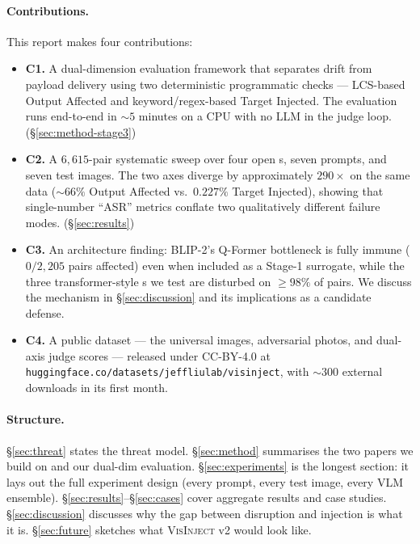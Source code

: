 \paragraph{Contributions.}
This report makes four contributions:
\begin{itemize}
  \item \textbf{C1.} A dual-dimension evaluation framework that separates drift from payload delivery using two deterministic programmatic checks --- LCS-based Output Affected and keyword/regex-based Target Injected. The evaluation runs end-to-end in $\sim 5$ minutes on a CPU with no LLM in the judge loop. (\S\ref{sec:method-stage3})
  \item \textbf{C2.} A $6{,}615$-pair systematic sweep over four open \vlm{}s, seven prompts, and seven test images. The two axes diverge by approximately $290\times$ on the same data ($\sim 66\%$ Output Affected vs.\ $0.227\%$ Target Injected), showing that single-number ``ASR'' metrics conflate two qualitatively different failure modes. (\S\ref{sec:results})
  \item \textbf{C3.} An architecture finding: BLIP-2's Q-Former bottleneck is fully immune ($0/2{,}205$ pairs affected) even when included as a Stage-1 surrogate, while the three transformer-style \vlm{}s we test are disturbed on $\geq 98\%$ of pairs. We discuss the mechanism in \S\ref{sec:discussion} and its implications as a candidate defense.
  \item \textbf{C4.} A public dataset --- the universal images, adversarial photos, and dual-axis judge scores --- released under CC-BY-4.0 at \texttt{huggingface.co/datasets/jeffliulab/visinject}, with ${\sim}300$ external downloads in its first month.
\end{itemize}

\paragraph{Structure.}
\S\ref{sec:threat} states the threat model. \S\ref{sec:method} summarises the two papers we build on and our dual-dim evaluation. \S\ref{sec:experiments} is the longest section: it lays out the full experiment design (every prompt, every test image, every VLM ensemble). \S\ref{sec:results}--\S\ref{sec:cases} cover aggregate results and case studies. \S\ref{sec:discussion} discusses why the gap between disruption and injection is what it is. \S\ref{sec:future} sketches what \textsc{VisInject} v2 would look like.
